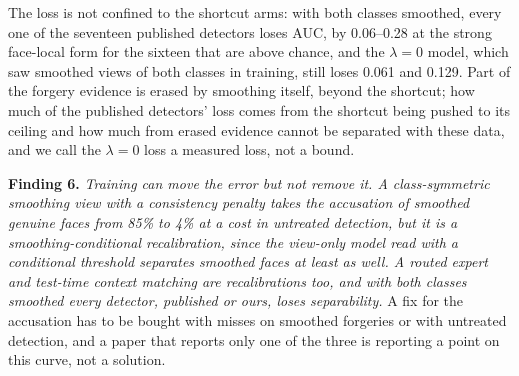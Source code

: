 \documentclass[conference]{IEEEtran}
\begin{document}
The loss is not confined to the shortcut arms: with both classes smoothed, every one of the seventeen published detectors
loses AUC, by 0.06--0.28 at
the strong face-local form for the sixteen that are above chance, and the $\lambda=0$ model, which saw smoothed views of both
classes in training, still loses 0.061 and 0.129.
Part of the forgery evidence is erased by smoothing itself, beyond the shortcut; how much of the published detectors'
loss comes from the shortcut being pushed to its ceiling and how much from erased evidence cannot be separated with these
data, and we call the $\lambda=0$ loss a measured loss, not a bound.

\textbf{Finding 6.} \emph{Training can move the error but not remove it. A class-symmetric smoothing view with a
consistency penalty takes the accusation of smoothed genuine faces from 85\% to 4\% at a cost in untreated detection, but it is
a smoothing-conditional recalibration, since the view-only model read with a conditional threshold separates smoothed
faces at least as well. A routed expert and test-time context matching are recalibrations too, and with both classes
smoothed every detector, published or ours, loses separability.}
A fix for the accusation has to be bought with misses on smoothed forgeries or with untreated detection, and a
paper that reports only one of the three is reporting a point on this curve, not a solution.
\end{document}
